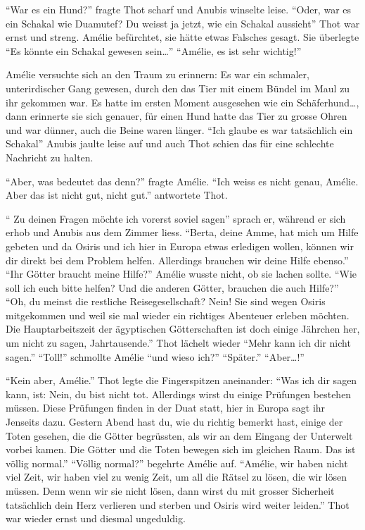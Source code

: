 \documentclass[11pt,titlepage,a5paper]{book}
\begin{document}
"`War es ein Hund?"' fragte Thot scharf und Anubis winselte leise. "`Oder, war es ein Schakal wie Duamutef? Du weisst ja jetzt, wie ein Schakal aussieht"' Thot war ernst und streng. Amélie befürchtet, sie hätte etwas Falsches gesagt. Sie überlegte "`Es könnte ein Schakal gewesen sein\dots"' "`Amélie, es ist sehr wichtig!"'

Amélie versuchte sich an den Traum zu erinnern: Es war ein schmaler, unterirdischer Gang gewesen, durch den das Tier mit einem Bündel im Maul zu ihr gekommen war. Es hatte im ersten Moment ausgesehen wie ein Schäferhund\dots, dann erinnerte sie sich genauer, für einen Hund hatte das Tier zu grosse Ohren und war dünner, auch die Beine waren länger. "`Ich glaube es war tatsächlich ein Schakal"' Anubis jaulte leise auf und auch Thot schien das für eine schlechte Nachricht zu halten.

"`Aber, was bedeutet das denn?"' fragte Amélie. "`Ich weiss es nicht genau, Amélie. Aber das ist nicht gut, nicht gut."' antwortete Thot. 
 
"` Zu deinen Fragen möchte ich vorerst soviel sagen"' sprach er, während er sich erhob und Anubis aus dem Zimmer liess. "`Berta, deine Amme, hat mich um Hilfe gebeten und da Osiris und ich hier in Europa etwas erledigen wollen, können wir dir direkt bei dem Problem helfen. Allerdings brauchen wir deine Hilfe ebenso."' "`Ihr Götter braucht meine Hilfe?"' Amélie wusste nicht, ob sie lachen sollte. "`Wie soll ich euch bitte helfen? Und die anderen Götter, brauchen die auch Hilfe?"' "`Oh, du meinst die restliche Reisegesellschaft? Nein! Sie sind wegen Osiris mitgekommen und weil sie mal wieder ein richtiges Abenteuer erleben möchten. Die Hauptarbeitszeit der ägyptischen Götterschaften ist doch einige Jährchen her, um nicht zu sagen, Jahrtausende."' Thot lächelt wieder "`Mehr kann ich dir nicht sagen."' "`Toll!"' schmollte Amélie "`und wieso ich?"' "`Später."' "`Aber\dots!"'

"`Kein aber, Amélie."' Thot legte die Fingerspitzen aneinander: "`Was ich dir sagen kann, ist: Nein, du bist nicht tot. Allerdings wirst du einige Prüfungen bestehen müssen. Diese Prüfungen finden in der Duat statt, hier in Europa sagt ihr Jenseits dazu. Gestern Abend hast du, wie du richtig bemerkt hast, einige der Toten gesehen, die die Götter begrüssten, als wir an dem Eingang der Unterwelt vorbei kamen. Die Götter und die Toten bewegen sich im gleichen Raum. Das ist völlig normal."' "`Völlig normal?"' begehrte Amélie auf. "`Amélie, wir haben nicht viel Zeit, wir haben viel zu wenig Zeit, um all die Rätsel zu lösen, die wir lösen müssen. Denn wenn wir sie nicht lösen, dann wirst du mit grosser Sicherheit tatsächlich dein Herz verlieren und sterben und Osiris wird weiter leiden."' Thot war wieder ernst und diesmal ungeduldig.
\end{document}
